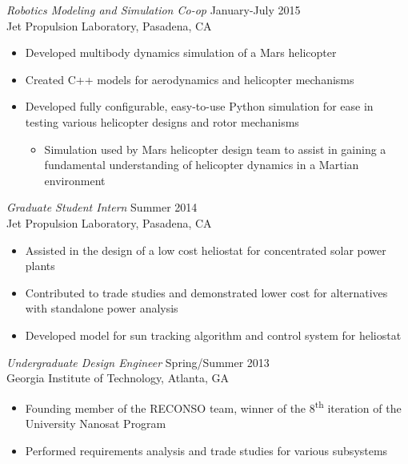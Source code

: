 \documentclass[margin]{resume} %
\begin{document}
\begin{resume}
{\sl Robotics Modeling and Simulation Co-op} \hfill January-July 2015 \\
Jet Propulsion Laboratory, Pasadena, CA

\begin{itemize} \itemsep -2pt %
\item Developed multibody dynamics simulation of a Mars helicopter 
\item Created C++ models for aerodynamics and helicopter mechanisms
\item Developed fully configurable, easy-to-use Python simulation for ease in testing various helicopter designs and rotor mechanisms
\vspace{-2mm}
	\begin{itemize}
	\item Simulation used by Mars helicopter design team to assist in gaining a fundamental understanding of helicopter 	dynamics in a Martian environment
	\end{itemize}
\end{itemize}
 
{\sl Graduate Student Intern} \hfill Summer 2014 \\
Jet Propulsion Laboratory, Pasadena, CA
\begin{itemize} \itemsep -2pt %
\item Assisted in the design of a low cost heliostat for concentrated solar power plants
\item Contributed to trade studies and demonstrated lower cost for alternatives with standalone power analysis
\item Developed model for sun tracking algorithm and control system for heliostat
\end{itemize} 

{\sl Undergraduate Design Engineer} \hfill Spring/Summer 2013 \\
Georgia Institute of Technology, Atlanta, GA
\begin{itemize} \itemsep -2pt %
\item Founding member of the RECONSO team, winner of the 8\textsuperscript{th} iteration of the University Nanosat Program
\item Performed requirements analysis and trade studies for various subsystems
\end{itemize} 



\end{resume}
\end{document}
